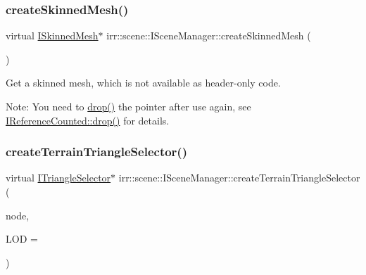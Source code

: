 \subsubsection{\texorpdfstring{create\+Skinned\+Mesh()}{createSkinnedMesh()}\hspace{0.1cm}{\footnotesize\ttfamily [2/2]}}
{\footnotesize\ttfamily virtual \hyperlink{classirr_1_1scene_1_1ISkinnedMesh}{I\+Skinned\+Mesh}$\ast$ irr\+::scene\+::\+I\+Scene\+Manager\+::create\+Skinned\+Mesh (\begin{DoxyParamCaption}{ }\end{DoxyParamCaption})\hspace{0.3cm}{\ttfamily [pure virtual]}}



Get a skinned mesh, which is not available as header-\/only code. 

Note\+: You need to \hyperlink{classirr_1_1IReferenceCounted_a03856a09355b89d178090c4a5f738543}{drop()} the pointer after use again, see \hyperlink{classirr_1_1IReferenceCounted_a03856a09355b89d178090c4a5f738543}{I\+Reference\+Counted\+::drop()} for details. \mbox{\label{classirr_1_1scene_1_1ISceneManager_af52f8c74e08637b7643d239542371bc5}} 
\subsubsection{\texorpdfstring{create\+Terrain\+Triangle\+Selector()}{createTerrainTriangleSelector()}\hspace{0.1cm}{\footnotesize\ttfamily [1/2]}}
{\footnotesize\ttfamily virtual \hyperlink{classirr_1_1scene_1_1ITriangleSelector}{I\+Triangle\+Selector}$\ast$ irr\+::scene\+::\+I\+Scene\+Manager\+::create\+Terrain\+Triangle\+Selector (\begin{DoxyParamCaption}\item[{\hyperlink{classirr_1_1scene_1_1ITerrainSceneNode}{I\+Terrain\+Scene\+Node} $\ast$}]{node,  }\item[{\hyperlink{namespaceirr_ac66849b7a6ed16e30ebede579f9b47c6}{s32}}]{L\+OD = {} }\end{DoxyParamCaption})\hspace{0.3cm}{\ttfamily [pure virtual]}}



